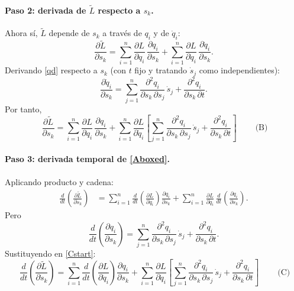 \paragraph{Paso 2: derivada de $\tilde L$ respecto a $s_k$.}
Ahora sí, $\tilde L$ depende de $s_k$ a través de $q_i$ y de $\dot q_i$:
\begin{equation}
\label{Bstart}
\frac{\partial \tilde L}{\partial s_k}
=\sum_{i=1}^n \frac{\partial L}{\partial q_i}\,\frac{\partial q_i}{\partial s_k}
+\sum_{i=1}^n \frac{\partial L}{\partial \dot q_i}\,
\frac{\partial \dot q_i}{\partial s_k}.
\end{equation}
Derivando \eqref{qd} respecto a $s_k$ (con $t$ fijo y tratando $\dot s_j$ como independientes):
\[
\frac{\partial \dot q_i}{\partial s_k}
=\sum_{j=1}^n \frac{\partial^2 q_i}{\partial s_k\,\partial s_j}\,\dot s_j
+\frac{\partial^2 q_i}{\partial s_k\,\partial t}.
\]
Por tanto,
\begin{equation}
\label{Bboxed}
\boxed{\ \frac{\partial \tilde L}{\partial s_k}
=\sum_{i=1}^n \frac{\partial L}{\partial q_i}\,\frac{\partial q_i}{\partial s_k}
+\sum_{i=1}^n \frac{\partial L}{\partial \dot q_i}\!\left[
\sum_{j=1}^n \frac{\partial^2 q_i}{\partial s_k\,\partial s_j}\,\dot s_j
+\frac{\partial^2 q_i}{\partial s_k\,\partial t}\right]\ } \qquad\text{(B)}
\end{equation}

\paragraph{Paso 3: derivada temporal de \eqref{Aboxed}.}
Aplicando producto y cadena:
\begin{align}
\frac{d}{dt}\!\left(\frac{\partial \tilde L}{\partial \dot s_k}\right)
&=\sum_{i=1}^n \frac{d}{dt}\!\left(\frac{\partial L}{\partial \dot q_i}\right)
\frac{\partial q_i}{\partial s_k}
+\sum_{i=1}^n \frac{\partial L}{\partial \dot q_i}\,
\frac{d}{dt}\!\left(\frac{\partial q_i}{\partial s_k}\right).
\label{Cstart}
\end{align}
Pero
\[
\frac{d}{dt}\!\left(\frac{\partial q_i}{\partial s_k}\right)
=\sum_{j=1}^n \frac{\partial^2 q_i}{\partial s_k\,\partial s_j}\,\dot s_j
+\frac{\partial^2 q_i}{\partial s_k\,\partial t}.
\]
Sustituyendo en \eqref{Cstart}:
\begin{equation}
\label{Cboxed}
\boxed{\ \frac{d}{dt}\!\left(\frac{\partial \tilde L}{\partial \dot s_k}\right)
=\sum_{i=1}^n \frac{d}{dt}\!\left(\frac{\partial L}{\partial \dot q_i}\right)
\frac{\partial q_i}{\partial s_k}
+\sum_{i=1}^n \frac{\partial L}{\partial \dot q_i}\!\left[
\sum_{j=1}^n \frac{\partial^2 q_i}{\partial s_k\,\partial s_j}\,\dot s_j
+\frac{\partial^2 q_i}{\partial s_k\,\partial t}\right]\ } \qquad\text{(C)}
\end{equation}

